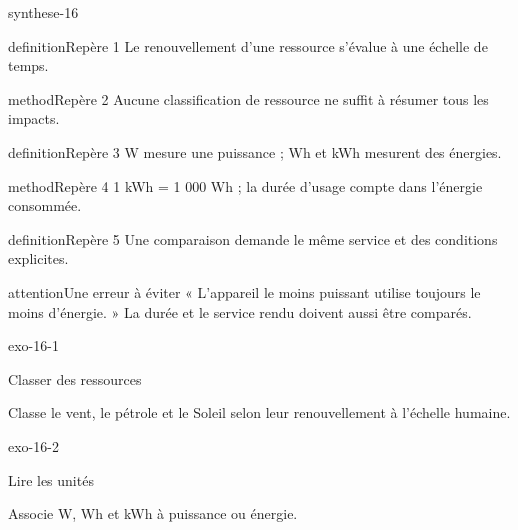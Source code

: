 \documentclass[12pt,twoside,openany]{book}
\begin{document}
\begin{pcFiche}{synthese-16}
\begin{pcEncadre}{definition}{Repère 1}
Le renouvellement d’une ressource s’évalue à une échelle de temps.\par
\end{pcEncadre}
\begin{pcEncadre}{method}{Repère 2}
Aucune classification de ressource ne suffit à résumer tous les impacts.\par
\end{pcEncadre}
\begin{pcEncadre}{definition}{Repère 3}
W mesure une puissance ; Wh et kWh mesurent des énergies.\par
\end{pcEncadre}
\begin{pcEncadre}{method}{Repère 4}
1 kWh = 1 000 Wh ; la durée d’usage compte dans l’énergie consommée.\par
\end{pcEncadre}
\begin{pcEncadre}{definition}{Repère 5}
Une comparaison demande le même service et des conditions explicites.\par
\end{pcEncadre}
\begin{pcEncadre}{attention}{Une erreur à éviter}
« L’appareil le moins puissant utilise toujours le moins d’énergie. » La durée et le service rendu doivent aussi être comparés.\par
\end{pcEncadre}
\end{pcFiche}
\clearpage{}
\begin{blocLivre}{exo-16-1}
\begin{exercice}[1]{Classer des ressources}
\begin{questions}
\item Classe le vent, le pétrole et le Soleil selon leur renouvellement à l’échelle humaine.
\end{questions}
\end{exercice}\end{blocLivre}
\begin{blocLivre}{exo-16-2}
\begin{exercice}[1]{Lire les unités}
\begin{questions}
\item Associe W, Wh et kWh à puissance ou énergie.
\end{questions}
\end{exercice}\end{blocLivre}
\end{document}
